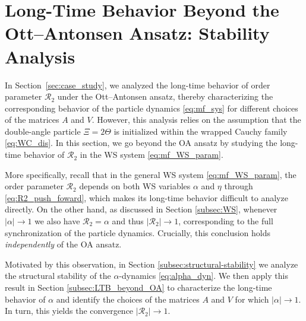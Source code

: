 \documentclass[10pt]{article}
\theoremstyle{definition}
\theoremstyle{definition}
\numberwithin{equation}{section}
\newcommand{\CR}{\mathcal{R}}
\begin{document}
\section{Long-Time Behavior Beyond the Ott--Antonsen Ansatz: Stability Analysis}\label{sec:stability}
In Section~\ref{sec:case_study}, we analyzed the long-time behavior of order parameter $\CR_2$ under the Ott--Antonsen ansatz, thereby characterizing the corresponding behavior of the particle dynamics \eqref{eq:mf_sys} for different choices of the matrices $A$ and $V$.
However, this analysis relies on the assumption that the double-angle particle $\Xi = 2\Theta$ is initialized within the wrapped Cauchy family \eqref{eq:WC_dis}.  
In this section, we go beyond the OA ansatz by studying the long-time behavior of $\CR_2$ in the WS system \eqref{eq:mf_WS_param}.

More specifically, recall that in the general WS system \eqref{eq:mf_WS_param}, the order parameter $\CR_2$ depends on both WS variables $\alpha$ and $\eta$ through \eqref{eq:R2_push_foward}, which makes its long-time behavior difficult to analyze directly.
On the other hand, as discussed in Section \ref{subsec:WS}, whenever $|\alpha| \rightarrow 1$ we also have $\CR_2 = \alpha$ and thus $|\CR_2| \rightarrow 1$, corresponding to the full synchronization of the particle dynamics.
Crucially, this conclusion holds \emph{independently} of the OA ansatz. 

Motivated by this observation, in Section \ref{subsec:structural-stability} we analyze the structural stability of the $\alpha$-dynamics \eqref{eq:alpha_dyn}.
We then apply this result in Section \ref{subsec:LTB_beyond_OA} to characterize the long-time behavior of $\alpha$ and identify the choices of the matrices $A$ and $V$ for which $|\alpha| \to 1$.
In turn, this yields the convergence $|\CR_2| \rightarrow 1$.
\end{document}
